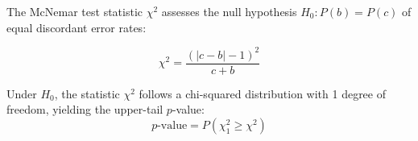 The McNemar test statistic $\chi^2$ assesses the null hypothesis $H_0: P(b) = P(c)$ of equal discordant error rates:

\begin{equation}
    \chi^2 = \frac{(|c - b| - 1)^2}{c + b}
\end{equation}

Under $H_0$, the statistic $\chi^2$ follows a chi-squared distribution with 1 degree of freedom, yielding the upper-tail $p$-value:
\begin{equation}
    p\text{-value} = P\left( \chi_1^2 \ge \chi^2 \right)
\end{equation}
